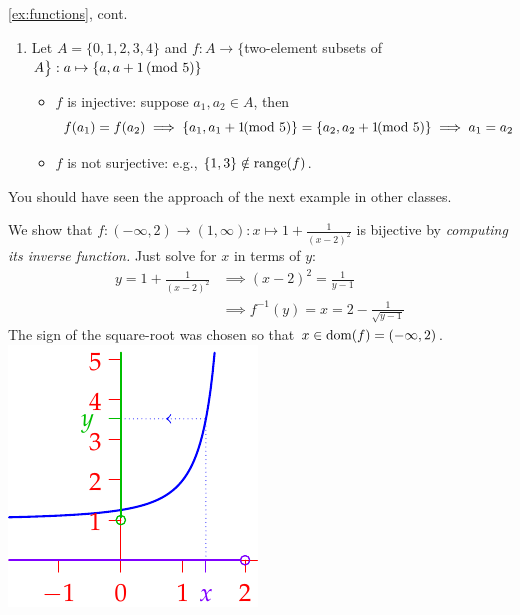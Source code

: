 \begin{examples*}{\ref{ex:functions}, cont.}{}
\begin{enumerate}
  
	  \item Let $A=\{0,1,2,3,4\}$ and $f:A\to\bigl\{$two-element subsets of $A\bigr\}:a\mapsto \{a,a+1\negthickspace\pmod{5}\}$
	  \begin{itemize}%
	    \item $f$ is injective: suppose $a_1,a_2\in A$, then
	    \[
	  		f(a_1)=f(a_2)\implies \{a_1,a_1+1\negthickspace\negthickspace\pmod{5}\}=\{a_2,a_2+1\negthickspace\negthickspace\pmod{5}\}\implies a_1=a_2
	  	\]
	  	\item $f$ is not surjective: e.g., $\{1,3\}\notin\operatorname{range}(f)$.
	  \end{itemize}
    
	\end{enumerate}
\end{examples*}


You should have seen the approach of the next example in other classes.

\begin{example}[lower separated=false, sidebyside, sidebyside align=top seam, sidebyside gap=0pt, righthand width=0.28\linewidth]{}{}
	We show that $f:(-\infty,2)\to (1,\infty): x\mapsto 1+\frac 1{(x-2)^2}$ is bijective by \emph{computing its inverse function.} Just solve for $x$ in terms of $y$: 
	\begin{align*}
		y=1+\frac 1{(x-2)^2}&\implies (x-2)^2=\frac 1{y-1}\\
		&\implies f^{-1}(y)=x=2-\frac 1{\sqrt{y-1}}
	\end{align*}
	The sign of the square-root was chosen so that $x\in\operatorname{dom}(f)=(-\infty,2)$.
	\tcblower
  \flushright\includegraphics{sets-09-bij2}
\end{example}

\goodbreak


